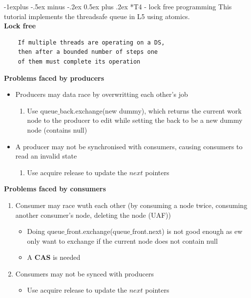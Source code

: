 \documentclass[10pt, landscape]{article}
\makeatletter
\renewcommand{\subsection}{\@startsection{subsection}{2}{0mm}%
                                {-1explus -.5ex minus -.2ex}%
                                {0.5ex plus .2ex}%
                                {\normalfont\normalsize\bfseries}}
\makeatother
\begin{document}
\begin{multicols}{4}
\subsection*{T4 - lock free programming} 
This tutorial implements the threadsafe queue in L5 using atomics.\\

\textbf{Lock free} \\
\begin{verbatim}
    If multiple threads are operating on a DS, 
    then after a bounded number of steps one 
    of them must complete its operation
\end{verbatim}

\textbf{Problems faced by producers} \\
\begin{itemize}
    \item  Producers may data race by overwritting each other's job
    \begin{enumerate}
        \item Use queue$\_$back.exchange(new dummy), which returns the current work node to the producer to edit while setting the back to be a new dummy node (contains null)
    \end{enumerate}
    \item A producer may not be synchronised with consumers, causing consumers to read an invalid state
    \begin{enumerate}
        \item Use acquire release to update the $next$ pointers 
    \end{enumerate}
\end{itemize}

\textbf{Problems faced by consumers} \\
\begin{enumerate}
    \item Consumer may race wuth each other (by consuming a node twice, consuming another consumer's node, deleting the node (UAF))
    \begin{itemize}
        \item Doing queue$\_$front.exchange(queue$\_$front.next) is not good enough as ew only want to exchange if the current node does not contain null 
        \item A \textbf{CAS} is needed
    \end{itemize}
    \item Consumers may not be synced with producers 
    \begin{itemize}
        \item Use acquire release to update the $next$ pointers
    \end{itemize}
\end{enumerate}


\end{multicols}
\end{document}
